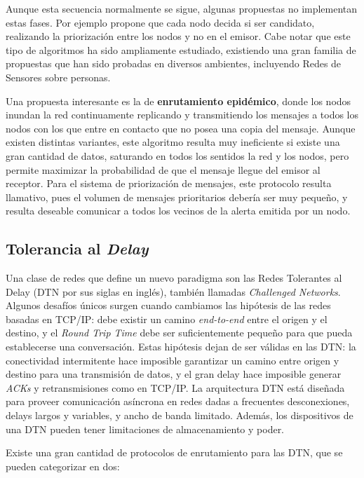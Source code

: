 \documentclass[10pt,preprint,onecolumn]{paper}
\begin{document}
Aunque esta secuencia normalmente se sigue, algunas propuestas no implementan estas fases. Por ejemplo \cite{op} propone que cada nodo decida si ser candidato, realizando la priorización entre los nodos y no en el emisor. Cabe notar que este tipo de algoritmos ha sido ampliamente estudiado, existiendo una gran familia de propuestas que han sido probadas en diversos ambientes, incluyendo Redes de Sensores sobre personas\cite{lv1}.

Una propuesta interesante es la de \textbf{enrutamiento epidémico}\cite{epidemic}, donde los nodos inundan la red continuamente replicando y transmitiendo los mensajes a todos los nodos con los que entre en contacto que no posea una copia del mensaje. Aunque existen distintas variantes, este algoritmo resulta muy ineficiente si existe una gran cantidad de datos, saturando en todos los sentidos la red y los nodos, pero permite maximizar la probabilidad de que el mensaje llegue del emisor al receptor. Para el sistema de priorización de mensajes, este protocolo resulta llamativo, pues el volumen de mensajes prioritarios debería ser muy pequeño, y resulta deseable comunicar a todos los vecinos de la alerta emitida por un nodo.

\subsection{Tolerancia al \emph{Delay}}
\label{sec:delay}

Una clase de redes que define un nuevo paradigma son las Redes Tolerantes al Delay (DTN por sus siglas en inglés), también llamadas \emph{Challenged Networks}\cite{challenged}. Algunos desafíos únicos surgen cuando cambiamos las hipótesis de las redes basadas en TCP/IP: debe existir un camino \emph{end-to-end} entre el origen y el destino, y el \emph{Round Trip Time} debe ser suficientemente pequeño para que pueda establecerse una conversación. Estas hipótesis dejan de ser válidas en las DTN: la conectividad intermitente hace imposible garantizar un camino entre origen y destino para una transmisión de datos, y el gran delay hace imposible generar \emph{ACKs} y retransmisiones como en TCP/IP. La arquitectura DTN está diseñada para proveer comunicación asíncrona en redes dadas a frecuentes desconexiones, delays largos y variables, y ancho de banda limitado. Además, los dispositivos de una DTN pueden tener limitaciones de almacenamiento y poder. 

Existe una gran cantidad de protocolos de enrutamiento para las DTN, que se pueden categorizar en dos\cite{surveydtn}:
\end{document}
